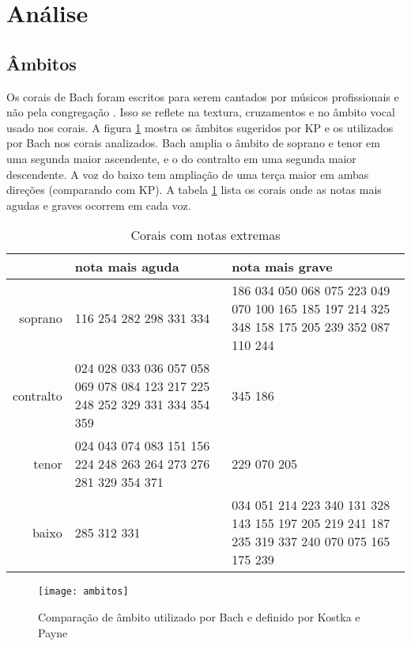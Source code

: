 \section{Análise}
\label{sec:analise}

\subsection{Âmbitos}
\label{sec:ambitos}

Os corais de Bach foram escritos para serem cantados por músicos
profissionais e não pela congregação \cite{bach41:371}. Isso  se reflete na textura, cruzamentos e no âmbito
vocal usado nos corais. A figura \ref{fig:ambito-kostka} mostra os
âmbitos sugeridos por KP e os utilizados por Bach nos corais
analizados. Bach amplia o âmbito de soprano e tenor em uma segunda
maior ascendente, e o do contralto em uma segunda maior descendente. A
voz do baixo tem ampliação de uma terça maior em ambas direções
(comparando com KP). A tabela \ref{tab:notas-extremas} lista os corais
onde as notas mais agudas e graves ocorrem em cada voz.

\begin{table}[t]
\begin{center}
\begin{small}
\begin{sc}
  \begin{tabular}{r|p{4cm}p{4cm}}
    & nota mais aguda & nota mais grave \\ 
    \hline
    soprano &  116 254 282 298 331 334 &  186 034 050 068 075 223 049 070 100 165 185 197 214 325 348 158 175
    205 239 352 087 110 244 \\ \aroundspace
    contralto & 024 028 033 036 057 058 069 078 084 123 217 225 248 252 329 331 334
    354 359 &   345 186 \\ \aroundspace
    tenor &   024 043 074 083 151 156 224 248 263 264 273 276 281 329
    354 371 &   229 070 205 \\ \aroundspace
    baixo &   285 312 331 &   034 051 214 223 340 131 328 143 155 197 205 219 241 187 235 319 337
    240 070 075 165 175 239 
  \end{tabular}
  \caption{Corais com notas extremas}
  \label{tab:notas-extremas}
\end{sc}
\end{small}
\end{center}
\end{table}

\begin{figure}
  \centering
  \texttt{[image: ambitos]}
  \caption{Comparação de âmbito utilizado por Bach e definido por Kostka e Payne}
  \label{fig:ambito-kostka}
\end{figure}


